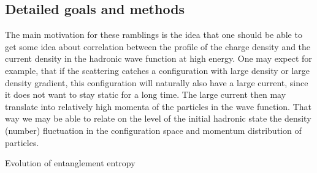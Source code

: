     \vspace{0.5em}
    \subsection{Detailed goals and methods}
        \label{sec:p21}
The main motivation for these ramblings is the idea that one should be able to get some idea about correlation
between the profile of the charge density and the current density in the hadronic wave function at high energy. One
may expect for example, that if the scattering catches a configuration with large density or large density gradient,
this configuration will naturally also have a large current, since it does not want to stay static for a long time. The
large current then may translate into relatively high momenta of the particles in the wave function. That way we
may be able to relate on the level of the initial hadronic state the density (number)
fluctuation in the configuration
space and momentum distribution of particles.


Evolution of entanglement entropy 


    \vspace{0.5em}
